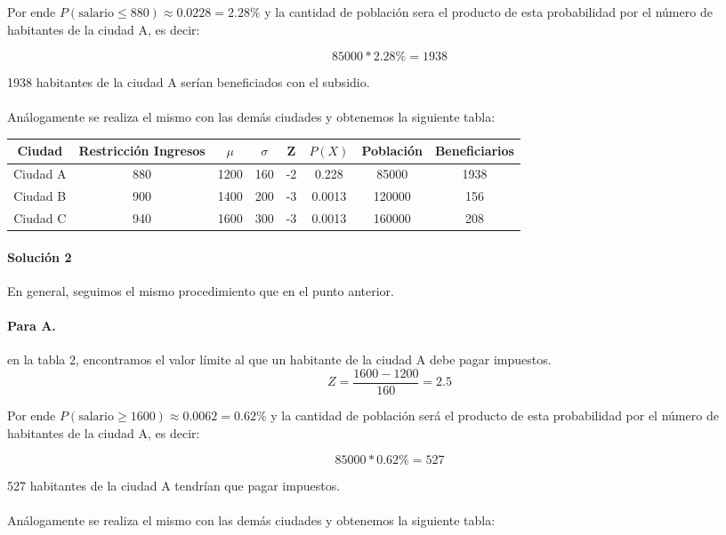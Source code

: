 \documentclass{article}
\begin{document}
Por ende $P(\text{salario} \leq 880) \approx 0.0228 = 2.28\%$ y la cantidad de  población sera el producto de esta probabilidad por el número de habitantes de la ciudad A, es decir: 

$$85000*2.28\% = 1938$$

1938 habitantes de la ciudad A serían beneficiados con el subsidio.

\paragraph{} Análogamente se realiza el mismo con las demás ciudades y obtenemos la siguiente tabla:


\begin{center}
	\begin{tabular}{ | c | c | c | c | c | c | c | c | }
		\hline
		\textbf{Ciudad} & \textbf{Restricción Ingresos} & \textbf{$\mu$} & \textbf{$\sigma$} & \textbf{Z} & \textbf{$P(X)$} & \textbf{Población} & \textbf{Beneficiarios}\\
		\hline
		Ciudad A & 880 & 1200 & 160 & -2 & 0.228 & 85000 & 1938 \\
		\hline
		Ciudad B & 900 & 1400 & 200 & -3 & 0.0013 & 120000 & 156 \\
		\hline
		Ciudad C & 940 & 1600 & 300 & -3 & 0.0013 & 160000 & 208 \\
		\hline
	\end{tabular}
\end{center}

\paragraph{Solución 2} En general, seguimos el mismo procedimiento que en el punto anterior.

\paragraph{Para A.} en la tabla 2, encontramos el valor límite al que un habitante de la ciudad A debe pagar impuestos.
$$Z = \frac{1600 - 1200}{160} =  2.5$$

Por ende $P(\text{salario} \geq 1600) \approx 0.0062 = 0.62\%$ y la cantidad de  población será el producto de esta probabilidad por el número de habitantes de la ciudad A, es decir: 

$$85000*0.62\% = 527$$

527 habitantes de la ciudad A tendrían que pagar impuestos.

\paragraph{} Análogamente se realiza el mismo con las demás ciudades y obtenemos la siguiente tabla:
\end{document}
